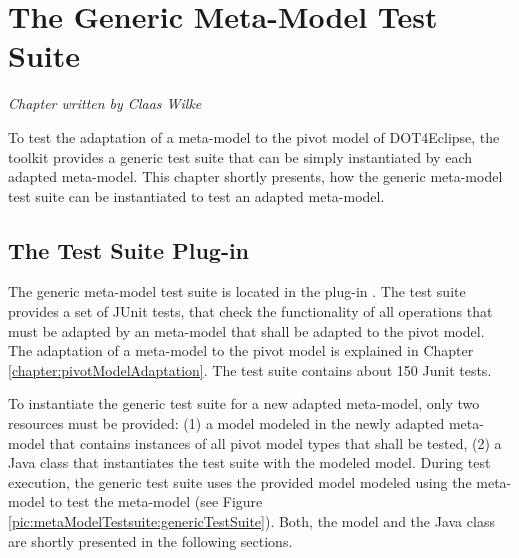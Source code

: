 \chapter{The Generic Meta-Model Test Suite}
\label{chapter:metaModelTestSuite}

\begin{flushright}
\textit{Chapter written by Claas Wilke}
\end{flushright}

To test the adaptation of a meta-model to the pivot model of \acl{DOT4Eclipse}, the toolkit provides a generic test suite that can be simply instantiated by each adapted meta-model. This chapter shortly presents, how the generic meta-model test suite can be instantiated to test an adapted meta-model.



\section{The Test Suite Plug-in}

The generic meta-model test suite is located in the plug-in . The test suite provides a set of JUnit tests, that check the functionality of all operations that must be adapted by an meta-model that shall be adapted to the pivot model. The adaptation of a meta-model to the pivot model is explained in Chapter \ref{chapter:pivotModelAdaptation}. The test suite contains about 150 Junit tests.

To instantiate the generic test suite for a new adapted meta-model, only two resources must be provided: (1) a model modeled in the newly adapted meta-model that contains instances of all pivot model types that shall be tested, (2) a Java class that instantiates the test suite with the modeled model. During test execution, the generic test suite uses the provided model modeled using the meta-model to test the meta-model (see Figure \ref{pic:metaModelTestsuite:genericTestSuite}). Both, the model and the Java class are shortly presented in the following sections.

